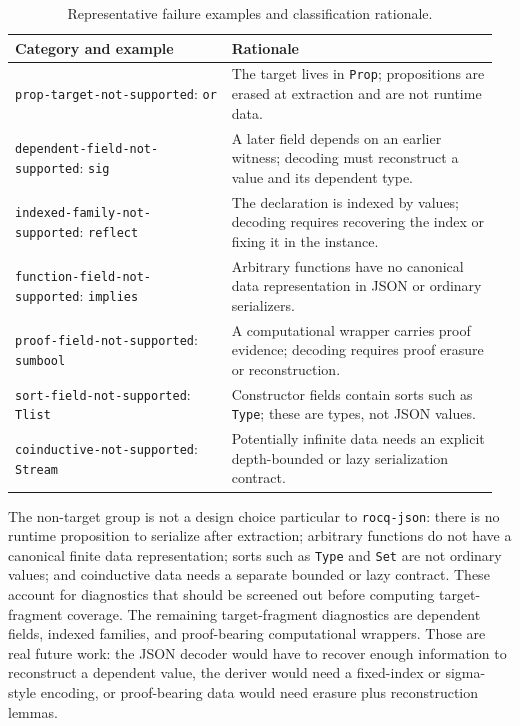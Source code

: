 \begin{table}
  \centering
  \caption{Representative failure examples and classification rationale.}
  \label{tab:failure-examples}
  \scriptsize
  \setlength{\tabcolsep}{3pt}
  \begin{tabular}{p{0.43\linewidth}p{0.53\linewidth}}
    \toprule
    Category and example & Rationale                                                                                                  \\
    \midrule
    \texttt{prop-target-not-supported}: \texttt{or}
                         & The target lives in \texttt{Prop}; propositions are erased at extraction and are not runtime data.         \\
    \texttt{dependent-field-not-supported}: \texttt{sig}
                         & A later field depends on an earlier witness; decoding must reconstruct a value and its dependent type.     \\
    \texttt{indexed-family-not-supported}: \texttt{reflect}
                         & The declaration is indexed by values; decoding requires recovering the index or fixing it in the instance. \\
    \texttt{function-field-not-supported}: \texttt{implies}
                         & Arbitrary functions have no canonical data representation in JSON or ordinary serializers.                 \\
    \texttt{proof-field-not-supported}: \texttt{sumbool}
                         & A computational wrapper carries proof evidence; decoding requires proof erasure or reconstruction.         \\
    \texttt{sort-field-not-supported}: \texttt{Tlist}
                         & Constructor fields contain sorts such as \texttt{Type}; these are types, not JSON values.                  \\
    \texttt{coinductive-not-supported}: \texttt{Stream}
                         & Potentially infinite data needs an explicit depth-bounded or lazy serialization contract.                  \\
    \bottomrule
  \end{tabular}
\end{table}

The non-target group is not a design choice particular to
\texttt{rocq-json}: there is no runtime proposition to serialize after
extraction; arbitrary functions do not have a canonical finite data
representation; sorts such as \texttt{Type} and \texttt{Set} are not ordinary
values; and coinductive data needs a separate bounded or lazy contract.  These
account for \JsonifiableSemanticNonTargets{} diagnostics that should be
screened out before computing target-fragment coverage.  The remaining
\JsonifiableDependentProofLimitations{} target-fragment diagnostics are
dependent fields, indexed families, and proof-bearing computational wrappers.
Those are real future work: the JSON decoder would have to recover enough
information to reconstruct a dependent value, the deriver would need a
fixed-index or sigma-style encoding, or proof-bearing data would need erasure
plus reconstruction lemmas.

